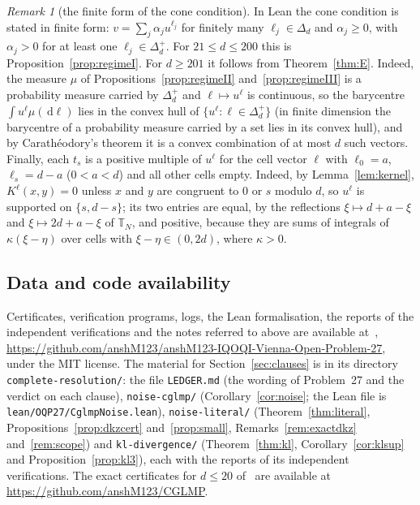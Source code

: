 \documentclass[11pt]{amsart}
\theoremstyle{definition}
\theoremstyle{remark}
\newtheorem{remark}[theorem]{Remark}
\numberwithin{equation}{section}
\newcommand{\T}{\mathbb{T}}
\newcommand{\dd}{\,\mathrm{d}}
\begin{document}
\begin{remark}[the finite form of the cone condition]\label{rem:finiteform}
In Lean the cone condition is stated in finite form: $v=\sum_j\alpha_ju^{\ell_j}$ for finitely many $\ell_j\in\Delta_d$
and $\alpha_j\ge0$, with $\alpha_j>0$ for at least one $\ell_j\in\Delta_d^+$. For $21\le d\le200$ this is
Proposition~\ref{prop:regimeI}. For $d\ge201$ it follows from Theorem~\ref{thm:E}. Indeed, the measure $\mu$ of Propositions~\ref{prop:regimeII}
and~\ref{prop:regimeIII} is a probability measure
carried by $\Delta_d^+$ and $\ell\mapsto u^\ell$ is continuous, so the barycentre $\int u^\ell\mu(\dd\ell)$ lies in the convex
hull of $\{u^\ell:\ell\in\Delta_d^+\}$ (in finite dimension the barycentre of a probability measure carried by a set lies
in its convex hull), and by Carath\'eodory's theorem it is a convex combination of at most $d$ such vectors. Finally,
each $t_s$ is a positive multiple of $u^\ell$ for the cell vector $\ell$ with $\ell_0=a$, $\ell_s=d-a$ ($0<a<d$) and all
other cells empty. Indeed, by Lemma~\ref{lem:kernel}, $K^\ell(x,y)=0$ unless $x$ and $y$ are congruent to $0$ or $s$
modulo $d$, so $u^\ell$ is supported on $\{s,d-s\}$; its two entries are equal, by the reflections $\xi\mapsto d+a-\xi$
and $\xi\mapsto2d+a-\xi$ of $\T_N$, and positive, because they are sums of integrals of $\kappa(\xi-\eta)$ over cells
with $\xi-\eta\in(0,2d)$, where $\kappa>0$.
\end{remark}

\subsection*{Data and code availability}
Certificates, verification programs, logs, the Lean formalisation, the reports of the independent verifications and the
notes referred to above are available at~\cite{repo-oqp27},
\url{https://github.com/anshM123/anshM123-IQOQI-Vienna-Open-Problem-27}, under the MIT license. The material for
Section~\ref{sec:clauses} is in its directory \texttt{complete-resolution/}: the file \texttt{LEDGER.md} (the wording of
Problem~27 and the verdict on each clause), \texttt{noise-cglmp/} (Corollary~\ref{cor:noise}; the Lean file is
\texttt{lean/OQP27/CglmpNoise.lean}), \texttt{noise-literal/} (Theorem~\ref{thm:literal}, Propositions~\ref{prop:dkzcert}
and~\ref{prop:small}, Remarks~\ref{rem:exactdkz} and~\ref{rem:scope}) and \texttt{kl-divergence/} (Theorem~\ref{thm:kl},
Corollary~\ref{cor:klsup} and Proposition~\ref{prop:kl3}), each with the reports of its independent verifications. The
exact certificates for $d\le20$ of~\cite{repo-cglmp} are available at \url{https://github.com/anshM123/CGLMP}.
\end{document}
